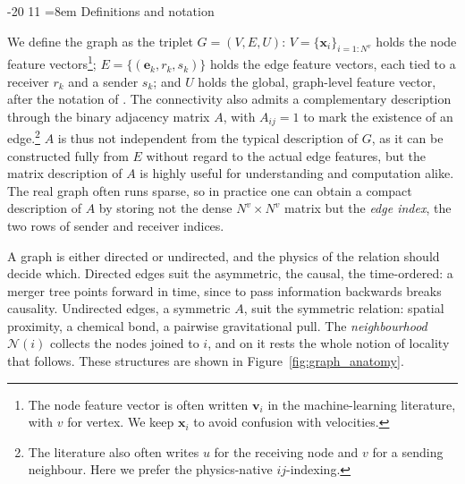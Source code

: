 \documentclass[graybox, envcountchap]{Template/svmult}
\makeatletter
\renewcommand\subsection{\@startsection{subsection}{2}{\z@}%
                       {-20\p@}%
                       {11\p@}%
                       {\normalfont\subsecsize\subsecstyle
                        \rightskip=\z@ \@plus 8em\pretolerance=10000 }}
\makeatother
\begin{document}
\subsection{Definitions and notation}
\label{subsec:graph-defs}

We define the graph as the triplet $G=(V,E,U)$: $V=\{\mathbf{x}_i\}_{i=1:N^v}$ holds the node feature vectors\footnote{The node feature vector is often written $\mathbf{v}_i$ in the machine-learning literature, with $v$ for vertex. We keep $\mathbf{x}_i$ to avoid confusion with velocities.}; $E=\{(\mathbf{e}_k,r_k,s_k)\}$ holds the edge feature vectors, each tied to a receiver $r_k$ and a sender $s_k$; and $U$ holds the global, graph-level feature vector, after the notation of \citet{Battaglia2018_relational_GN}. The connectivity also admits a complementary description through the binary adjacency matrix $A$, with $A_{ij}=1$ to mark the existence of an edge.\footnote{The literature also often writes $u$ for the receiving node and $v$ for a sending neighbour. Here we prefer the physics-native $ij$-indexing.} $A$ is thus not independent from the typical description of $G$, as it can be constructed fully from $E$ without regard to the actual edge features, but the matrix description of $A$ is highly useful for understanding and computation alike. The real graph often runs sparse, so in practice one can obtain a compact description of $A$ by storing not the dense $N^v\times N^v$ matrix but the \emph{edge index}, the two rows of sender and receiver indices.

A graph is either directed or undirected, and the physics of the relation should decide which. Directed edges suit the asymmetric, the causal, the time-ordered: a merger tree points forward in time, since to pass information backwards breaks causality. Undirected edges, a symmetric $A$, suit the symmetric relation: spatial proximity, a chemical bond, a pairwise gravitational pull. The \emph{neighbourhood} $\mathcal{N}(i)$ collects the nodes joined to $i$, and on it rests the whole notion of locality that follows. These structures are shown in Figure~\ref{fig:graph_anatomy}.
\end{document}
